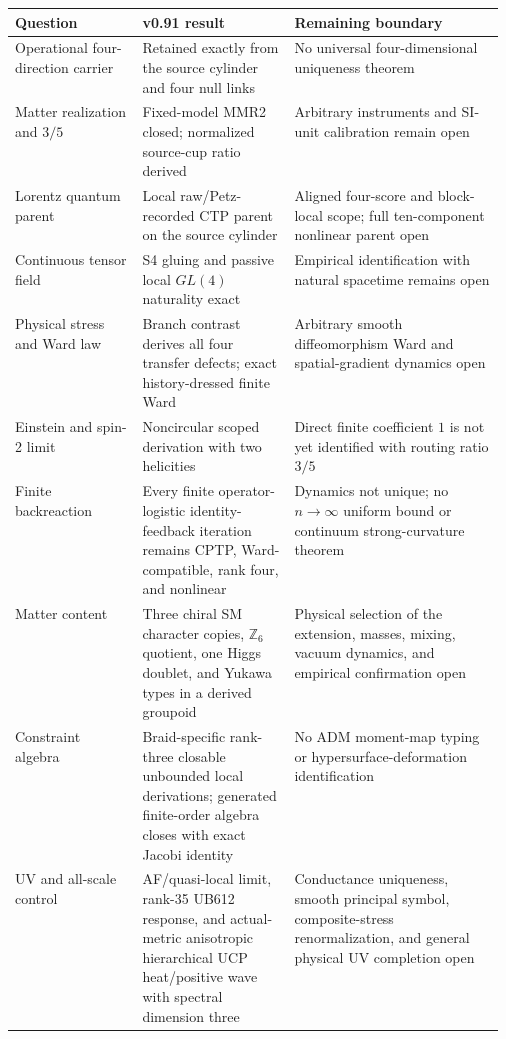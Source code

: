 \documentclass[11pt]{article}
\theoremstyle{definition}
\theoremstyle{remark}
\begin{document}
\begin{table}[ht]
\centering
\small
\begin{tabularx}{\linewidth}{>{\raggedright\arraybackslash}p{0.26\linewidth} >{\raggedright\arraybackslash}p{0.31\linewidth} X}
\toprule
Question & v0.91 result & Remaining boundary \\
\midrule
Operational four-direction carrier & Retained exactly from the source cylinder and four null links & No universal four-dimensional uniqueness theorem \\
Matter realization and $3/5$ & Fixed-model MMR2 closed; normalized source-cup ratio derived & Arbitrary instruments and SI-unit calibration remain open \\
Lorentz quantum parent & Local raw/Petz-recorded CTP parent on the source cylinder & Aligned four-score and block-local scope; full ten-component nonlinear parent open \\
Continuous tensor field & S4 gluing and passive local $GL(4)$ naturality exact & Empirical identification with natural spacetime remains open \\
Physical stress and Ward law & Branch contrast derives all four transfer defects; exact history-dressed finite Ward & Arbitrary smooth diffeomorphism Ward and spatial-gradient dynamics open \\
Einstein and spin-2 limit & Noncircular scoped derivation with two helicities & Direct finite coefficient $1$ is not yet identified with routing ratio $3/5$ \\
Finite backreaction & Every finite operator-logistic identity-feedback iteration remains CPTP, Ward-compatible, rank four, and nonlinear & Dynamics not unique; no $n\to\infty$ uniform bound or continuum strong-curvature theorem \\
Matter content & Three chiral SM character copies, $\mathbb Z_6$ quotient, one Higgs doublet, and Yukawa types in a derived groupoid & Physical selection of the extension, masses, mixing, vacuum dynamics, and empirical confirmation open \\
Constraint algebra & Braid-specific rank-three closable unbounded local derivations; generated finite-order algebra closes with exact Jacobi identity & No ADM moment-map typing or hypersurface-deformation identification \\
UV and all-scale control & AF/quasi-local limit, rank-35 UB612 response, and actual-metric anisotropic hierarchical UCP heat/positive wave with spectral dimension three & Conductance uniqueness, smooth principal symbol, composite-stress renormalization, and general physical UV completion open \\

\end{tabularx}
\end{table}
\end{document}
